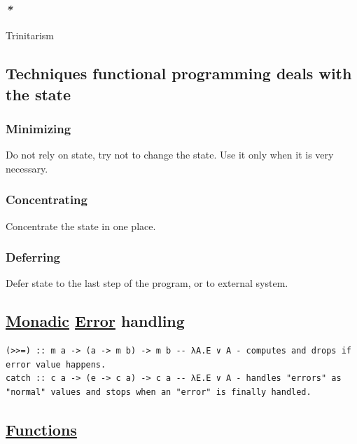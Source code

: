\documentclass[11pt]{article}
\begin{document}
\subsubsection{\emph{*}}
\label{sec:orga010b5f}
\label{org4271be7}Trinitarism\\

\subsection{Techniques functional programming deals with the state}
\label{sec:org74000a4}

\subsubsection{Minimizing}
\label{sec:org6c8a82b}

Do not rely on state, try not to change the state. Use it only when it is very necessary.\\

\subsubsection{Concentrating}
\label{sec:org7054859}

Concentrate the state in one place.\\

\subsubsection{Deferring}
\label{sec:org60874be}

Defer state to the last step of the program, or to external system.\\

\subsection{\hyperref[orgad51197]{Monadic} \hyperref[org2b27c5e]{Error} handling}
\label{sec:orga34dd45}

\begin{verbatim}
(>>=) :: m a -> (a -> m b) -> m b -- λA.E ∨ A - computes and drops if error value happens.
catch :: c a -> (e -> c a) -> c a -- λE.E ∨ A - handles "errors" as "normal" values and stops when an "error" is finally handled.
\end{verbatim}

\subsection{\hyperref[orgaa8fb87]{Functions}}
\label{sec:org0d1a5b7}
\end{document}
